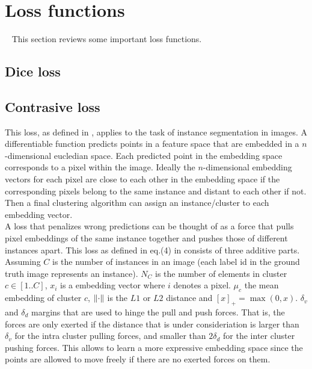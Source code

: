 \section{Loss functions}~\label{ssec:losses}
This section reviews some important loss functions.

\subsection{Dice loss}\label{ssec:loss_dice}

\subsection{Contrasive loss}\label{ssec:loss_contrastive}

This loss, as defined in \cite{brab2017semantic}, applies to the task of instance segmentation in images. A differentiable function predicts points in a feature space that are embedded in a $n$-dimensional eucledian space. Each predicted point in the embedding space corresponds to a pixel within the image. Ideally the $n$-dimensional embedding vectors for each pixel are close to each other in the embedding space if the corresponding pixels belong to the same instance and distant to each other if not. Then a final clustering algorithm can assign an instance/cluster to each embedding vector.\\
A loss that penalizes wrong predictions can be thought of as a force that pulls pixel embeddings of the same instance together and pushes those of different instances apart.
This loss as defined in eq.(4) in \cite{brab2017semantic} consists of three additive parts. Assuming $C$ is the number of instances in an image (each label id in the ground truth image represents an instance). $N_C$ is the number of elements in cluster $c \in [1..C]$, $x_i$ is a embedding vector where $i$ denotes a pixel. $\mu_c$ the mean embedding of cluster $c$, $\left\lVert\cdot\right\rVert$ is the $L1$ or $L2$ distance and $[x]_+ = \max(0, x)$. $\delta_v$ and $\delta_d$ margins that are used to hinge the pull and push forces. That is, the forces are only exerted if the distance that is under consideriation is larger than $\delta_v$ for the intra cluster pulling forces, and smaller than $2\delta_d$ for the inter cluster pushing forces. This allows to learn a more expressive embedding space since the points are allowed to move freely if there are no exerted forces on them.\\

